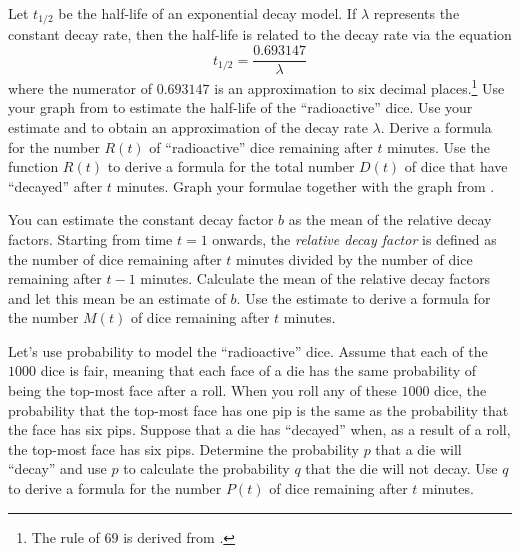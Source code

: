 \documentclass[a4paper,oneside,12pt]{article}
\begin{document}
\begin{problem}
\begin{packedenum}
  \item\label{subprob:radioactive_dice_decay_constant}
    Let $t_{1/2}$ be the half-life of an exponential decay model.  If
    $\lambda$ represents the constant decay rate, then the half-life
    is related to the decay rate via the equation
    \begin{equation}
    \label{eqn:half_life_related_to_decay_rate}
    t_{1/2}
    =
    \frac{0.693147}{\lambda}
    \end{equation}
    where the numerator of $0.693147$ is an approximation to six
    decimal places.\footnote{
      The rule of $69$ is derived from
      .
    }
    Use your graph
    from  to estimate
    the half-life of the ``radioactive'' dice.  Use your estimate and
     to obtain an
    approximation of the decay rate $\lambda$.  Derive a formula for
    the number $R(t)$ of ``radioactive'' dice remaining after $t$
    minutes.  Use the function $R(t)$ to derive a formula for the
    total number $D(t)$ of dice that have ``decayed'' after $t$
    minutes.  Graph your formulae together with the graph
    from .

  \item\label{subprob:radioactive_dice_mean_decay_rate}
    You can estimate the constant decay factor $b$ as the mean of the
    relative decay factors.  Starting from time $t = 1$ onwards, the
    \emph{relative decay factor} is defined as the number of dice
    remaining after $t$ minutes divided by the number of dice
    remaining after $t - 1$ minutes.  Calculate the mean of the
    relative decay factors and let this mean be an estimate of $b$.
    Use the estimate to derive a formula for the number  $M(t)$ of
    dice remaining after $t$ minutes.

  \item\label{subprob:radioactive_dice_probability}
    Let's use probability to model the ``radioactive'' dice.  Assume
    that each of the $1000$ dice is fair, meaning that each face of a
    die has the same probability of being the top-most face after a
    roll.  When you roll any of these $1000$ dice, the probability
    that the top-most face has one pip is the same as the probability
    that the face has six pips.  Suppose that a die has ``decayed''
    when, as a result of a roll, the top-most face has six pips.
    Determine the probability $p$ that a die will ``decay'' and use
    $p$ to calculate the probability $q$ that the die will not decay.
    Use $q$ to derive a formula for the number $P(t)$ of dice
    remaining after $t$ minutes.


\end{packedenum}
\end{problem}
\end{document}
